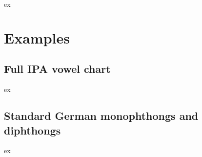 \documentclass[a4paper,11pt]{article}
\begin{document}
\begin{tcblisting}{ex}
\begin{vowelchart}[width=4cm, simple]
\end{vowelchart}
\end{tcblisting}




\section{Examples}

\subsection*{Full IPA vowel chart}

\begin{tcblisting}{ex}
\begin{vowelchart}
    
    
    
    
    
    
    
    
    
\end{vowelchart}
\end{tcblisting}



\subsection*{Standard German monophthongs and diphthongs}

\begin{tcblisting}{ex}
\begin{vowelchart}[width=4cm]
  \large
    
    
    
    
   
\end{vowelchart}
\end{tcblisting}
\end{document}

